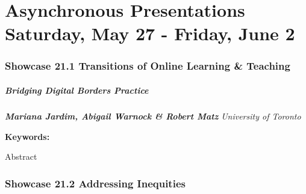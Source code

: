 \documentclass[
]{book}
\begin{document}
\hypertarget{asynchronous-presentations-saturday-may-27---friday-june-2}{%
\chapter*{Asynchronous Presentations \textbar{} Saturday, May 27 - Friday, June 2}\label{asynchronous-presentations-saturday-may-27---friday-june-2}}

\hypertarget{showcase-21.1-transitions-of-online-learning-teaching}{%
\subsection*{Showcase 21.1 \textbar{} Transitions of Online Learning \& Teaching}\label{showcase-21.1-transitions-of-online-learning-teaching}}

\begin{session}
\hypertarget{bridging-digital-borders-practice}{%
\paragraph*{\texorpdfstring{\textbf{Bridging Digital Borders} \textbar{}
Practice}{Bridging Digital Borders \textbar{} Practice}}\label{bridging-digital-borders-practice}}

\textbf{\emph{Mariana Jardim, Abigail Warnock \& Robert Matz}}
\textbar{} \emph{University of Toronto}

\textbf{Keywords:}

Abstract
\end{session}

\hypertarget{showcase-21.2-addressing-inequities}{%
\subsection*{Showcase 21.2 \textbar{} Addressing Inequities}\label{showcase-21.2-addressing-inequities}}
\end{document}
